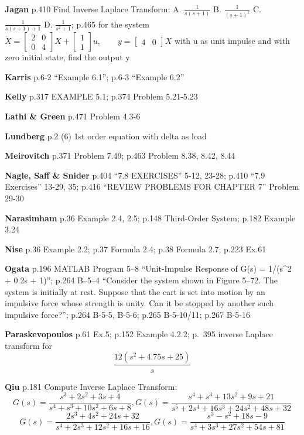 \documentclass[
  11pt,
]{article}
\begin{document}
\textbf{Jagan} p.410 Find Inverse Laplace Transform: A.
\(\frac{1}{s(s+1)}\) B. \(\frac{1}{(s+1)^2}\) C.
\(\frac{1}{s(s+1) + 1}\) D. \(\frac{1}{s^2 + 1}\); p.465 for the system
\(\dot{X} = \begin{bmatrix} 2 & 0 \\ 0 & 4 \end{bmatrix} X + \begin{bmatrix} 1 \\ 1 \end{bmatrix} u, \qquad y = \begin{bmatrix} 4 & 0 \end{bmatrix} X\)
with u as unit impulse and with zero initial state, find the output y

\textbf{Karris} p.6-2 ``Example 6.1''; p.6-3 ``Example 6.2''

\textbf{Kelly} p.317 EXAMPLE 5.1; p.374 Problem 5.21-5.23

\textbf{Lathi \& Green} p.471 Problem 4.3-6

\textbf{Lundberg} p.2 (6) 1st order equation with delta as load

\textbf{Meirovitch} p.371 Problem 7.49; p.463 Problem 8.38, 8.42, 8.44

\textbf{Nagle, Saff \& Snider} p.404 ``7.8 EXERCISES'' 5-12, 23-28;
p.410 ``7.9 Exercises'' 13-29, 35; p.416 ``REVIEW PROBLEMS FOR CHAPTER
7'' Problem 29-30

\textbf{Narasimham} p.36 Example 2.4, 2.5; p.148 Third-Order System;
p.182 Example 3.24

\textbf{Nise} p.36 Example 2.2; p.37 Formula 2.4; p.38 Formula 2.7;
p.223 Ex.61

\textbf{Ogata} p.196 MATLAB Program 5--8 ``Unit-Impulse Response of G(s)
= 1/(s\^{}2 + 0.2s + 1)''; p.264 B--5--4 ``Consider the system shown in
Figure 5--72. The system is initially at rest. Suppose that the cart is
set into motion by an impulsive force whose strength is unity. Can it be
stopped by another such impulsive force?''; p.264 B-5-5, B-5-6; p.265
B-5-10/11; p.267 B-5-16

\textbf{Paraskevopoulos} p.61 Ex.5; p.152 Example 4.2.2; p.~395 inverse
Laplace transform for \[\frac{12(s^2 + 4.75s + 25)}{s}\]

\textbf{Qiu} p.181 Compute Inverse Laplace Transform:
\[G(s) = \frac{s^3 + 2s^2 + 3s + 4}{s^4 + s^3 + 10s^2 + 6s + 8}, G(s) = \frac{s^4 + s^3 + 13s^2 + 9s + 21}{s^5 + 2s^4 + 16s^3 + 24s^2 + 48s + 32}\]
\[G(s) = \frac{2s^3 + 4s^2 + 24s + 32}{s^4 + 2s^3 + 12s^2 + 16s + 16}, G(s) = \frac{s^3 - s^2 + 18s - 9}{s^4 + 3s^3 + 27s^2 + 54s + 81}\]
\end{document}
